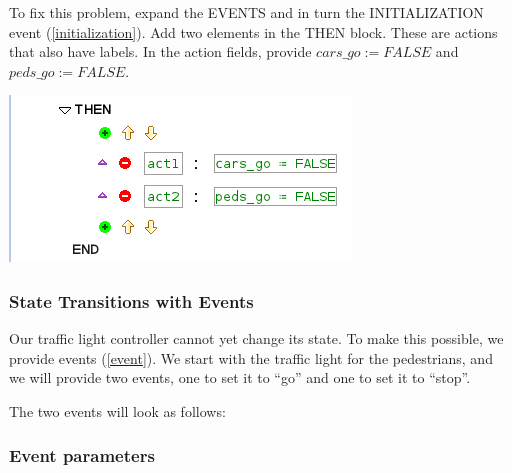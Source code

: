 To fix this problem, expand the \textsf{EVENTS} and in turn the INITIALIZATION event (\ref{initialization}).  Add two elements in the \textsf{THEN} block.  These are actions that also have labels.  In the action fields, provide $cars\_go :=  FALSE$ and $peds\_go :=  FALSE$.
\begin{center}
	\includegraphics[]{img/tutorial/tut_3_events.png}
\end{center}

\subsubsection{State Transitions with Events}

Our traffic light controller cannot yet change its state.  To make this possible, we provide events (\ref{event}). We start with the traffic light for the pedestrians, and we will provide two events, one to set it to ``go'' and one to set it to ``stop''.


The two events will look as follows:


\subsubsection{Event parameters}


